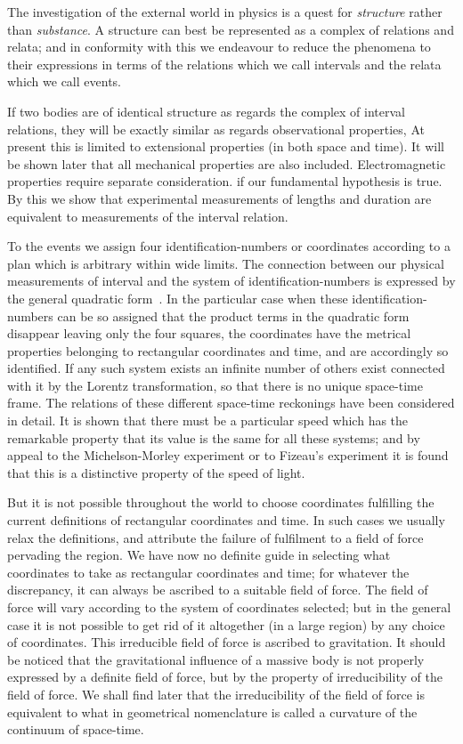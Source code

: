 \documentclass[12pt]{book}
\begin{document}

The investigation of the external world in physics is a quest for \emph{structure}
rather than \emph{substance}. A structure can best be represented as a complex of
relations and relata; and in conformity with this we endeavour to reduce the
phenomena to their expressions in terms of the relations which we call
intervals and the relata which we call events.

If two bodies are of identical structure as regards the complex of interval
relations, they will be exactly similar as regards observational properties\footnotemark,\footnotetext
  {At present this is limited to extensional properties (in both space and time). It will be
  shown later that all mechanical properties are also included. Electromagnetic properties require
  separate consideration.}
if
our fundamental hypothesis is true. By this we show that experimental
measurements of lengths and duration are equivalent to measurements of the
interval relation.

To the events we assign four identification-numbers or coordinates
according to a plan which is arbitrary within wide limits. The connection
between our physical measurements of interval and the system of identification-numbers
is expressed by the general quadratic form~. In the particular
case when these identification-numbers can be so assigned that the product
terms in the quadratic form disappear leaving only the four squares, the
coordinates have the metrical properties belonging to rectangular coordinates
and time, and are accordingly so identified. If any such system exists an
infinite number of others exist connected with it by the Lorentz transformation,
so that there is no unique space-time frame. The relations of
these different space-time reckonings have been considered in detail. It is
shown that there must be a particular speed which has the remarkable
property that its value is the same for all these systems; and by appeal to
the Michelson-Morley experiment or to Fizeau's experiment it is found that
this is a distinctive property of the speed of light.

But it is not possible throughout the world to choose coordinates fulfilling
the current definitions of rectangular coordinates and time. In such cases we
usually relax the definitions, and attribute the failure of fulfilment to a field
of force pervading the region. We have now no definite guide in selecting
what coordinates to take as rectangular coordinates and time; for whatever
the discrepancy, it can always be ascribed to a suitable field of force. The
field of force will vary according to the system of coordinates selected; but in
the general case it is not possible to get rid of it altogether (in a large region)
by any choice of coordinates. This irreducible field of force is ascribed to
gravitation. It should be noticed that the gravitational influence of a massive
body is not properly expressed by a definite field of force, but by the property
of irreducibility of the field of force. We shall find later that the irreducibility
of the field of force is equivalent to what in geometrical nomenclature is
called a curvature of the continuum of space-time.
\end{document}
